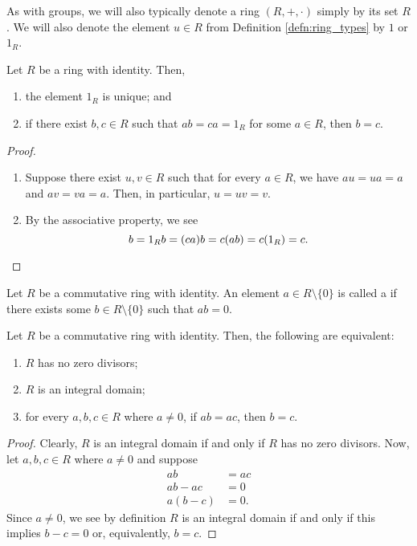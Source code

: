 As with groups, we will also typically denote a ring $ (R,+,\cdot) $ simply by its set $ R $. We will also denote the element $ u\in R $ from Definition \ref{defn:ring_types} by $ 1 $ or $ 1_R $.

\begin{prop}
Let $ R $ be a ring with identity. Then,
\begin{enumerate}
    \item the element $ 1_R $ is unique; and
    \item if there exist $ b,c\in R $ such that $ ab=ca=1_R $ for some $ a\in R $, then $ b=c $.
\end{enumerate}
\end{prop}
\begin{proof}~
\begin{enumerate}
    \item Suppose there exist $ u,v\in R $ such that for every $ a\in R $, we have $ au=ua=a $ and $ av=va=a $. Then, in particular, $ u=uv=v $.

    \item By the associative property, we see
    \begin{equation*}
        b=1_Rb=(ca)b=c(ab)=c(1_R)=c.\qedhere
    \end{equation*}
\end{enumerate}
\end{proof}

\begin{defn}
Let $ R $ be a commutative ring with identity. An element $ a\in R\setminus\{0\} $ is called a  if there exists some $ b\in R\setminus\{0\} $ such that $ ab=0 $.
\end{defn}

\begin{prop}
Let $ R $ be a commutative ring with identity. Then, the following are equivalent:
\begin{enumerate}
    \item $ R $ has no zero divisors;
    \item $ R $ is an integral domain;
    \item for every $ a,b,c\in R $ where $ a\neq 0 $, if $ ab=ac $, then $ b=c $.
\end{enumerate}
\end{prop}
\begin{proof}
Clearly, $ R $ is an integral domain if and only if $ R $ has no zero divisors. Now, let $ a,b,c\in R $ where $ a\neq 0 $ and suppose
\begin{align*}
    ab &= ac \\
    ab-ac &= 0 \\
    a(b-c) &= 0.
\end{align*}
Since $ a\neq 0 $, we see by definition $ R $ is an integral domain if and only if this implies $ b-c=0 $ or, equivalently, $ b=c $.
\end{proof}

